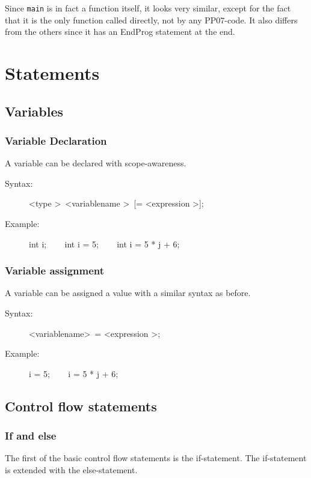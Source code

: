 \documentclass[10pt,a4paper]{report}
\begin{document}
Since \texttt{main} is in fact a function itself, it looks very similar, except for the fact that it is the only function called directly, not by any PP07-code. It also differs from the others since it has an EndProg statement at the end.

\section{Statements}

\subsection{Variables}

\subsubsection*{Variable Declaration}
A variable can be declared with scope-awareness.
\begin{description}
	\item[Syntax:] 
		\textless type \textgreater ~\textless variablename \textgreater ~[= \textless expression \textgreater];
	\item[Example:] 
		int i; ~~~ 
		int i = 5;  ~~~ 
		int i = 5 * j + 6;
\end{description} 


\subsubsection*{Variable assignment}
A variable can be assigned a value with a similar syntax as before.
\begin{description}
	\item[Syntax:] 
		\textless variablename\textgreater ~= \textless expression \textgreater;
	\item[Example:] 
		i = 5; ~~~ 
		i = 5 * j + 6;
\end{description} 

\subsection{Control flow statements}

\subsubsection*{If and else}
The first of the basic control flow statements is the if-statement. The if-statement is extended with the else-statement.
\end{document}
